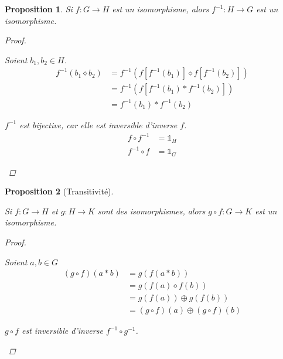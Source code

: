 \documentclass{report}
\newtheorem*{prop}{Proposition}
\theoremstyle{definition}
\theoremstyle{remark}
\begin{document}
	\begin{prop}
		Si $f:G \to H$ est un isomorphisme, alors $f^{-1}:H \to G$ est un isomorphisme.
		\begin{proof}~

			\begin{nlist}
				\item Soient $b_1,b_2 \in H$.
				\begin{align*}
					f^{-1}(b_1 \diamond b_2)&= f^{-1}\left( f\left[ f^{-1}\left( b_1 \right) \right] \diamond f\left[ f^{-1}\left( b_2 \right) \right] \right)\\
					&= f^{-1}\left( f\left[ f^{-1}\left( b_1 \right) * f^{-1}\left( b_2 \right) \right] \right)\\
					&= f^{-1}(b_1) * f^{-1}(b_2)
				\end{align*}
				\item $f^{-1}$ est bijective, car elle est inversible d'inverse $f$.
				\begin{align*}
					f \circ f^{-1}&= \mathds{1}_H\\
					f^{-1} \circ f&= \mathds{1}_G
				\end{align*}
			\end{nlist}
		\end{proof}
	\end{prop}
	\begin{prop}[Transitivit\'e]~

		Si $f:G \to H$ et $g:H \to K$ sont des isomorphismes, alors $g \circ f:G \to K$ est un isomorphisme.
		\begin{proof}~

			\begin{nlist}
				\item Soient $a,b \in G$
				\begin{align*}
					(g \circ f)(a*b)&= g(f(a*b))\\
					&= g(f(a) \diamond f(b))\\
					&= g(f(a)) \oplus g(f(b))\\
					&= (g \circ f)(a) \oplus (g \circ f)(b)
				\end{align*}
				\item $g \circ f$ est inversible d'inverse $f^{-1} \circ g^{-1}$.
			\end{nlist}
		\end{proof}
	\end{prop}
\end{document}
